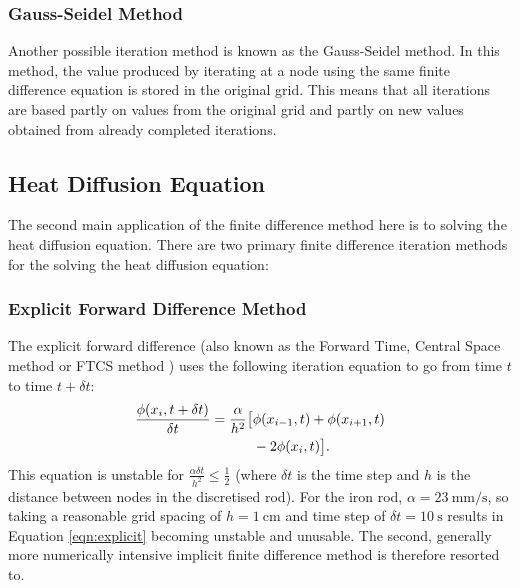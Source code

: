 \subsubsection{Gauss-Seidel Method}
\label{subsubsec:gauss-seidel}

Another possible iteration method is known as the Gauss-Seidel method. In this method, the value produced by iterating at a node using the same finite difference equation is stored in the original grid. This means that all iterations are based partly on values from the original grid and partly on new values obtained from already completed iterations.

\subsection{Heat Diffusion Equation}
\label{subsec:heat_diffusion_equation}

The second main application of the finite difference method here is to solving the heat diffusion equation. There are two primary finite difference iteration methods for the solving the heat diffusion equation:

\subsubsection{Explicit Forward Difference Method}
\label{subsubsec:explicit}

The explicit forward difference (also known as the Forward Time, Central Space method or FTCS method \cite{roache1972}) uses the following iteration equation to go from time $t$ to time $t+\delta t$:
\begin{align}
    \frac{\phi(x_i,t+\delta t)}{\delta t} = \frac{\alpha}{h^2}\big[&\phi(x_{i-1},t) + \phi(x_{i+1},t) \notag \\
                                                               & - 2\phi(x_i,t)\big].\label{eqn:explicit}
\end{align}
This equation is unstable for $\frac{\alpha \delta t}{h^2} \leq \frac{1}{2}$ \cite{tannehill1997} (where $\delta t$ is the time step and $h$ is the distance between nodes in the discretised rod). For the iron rod, $\alpha = \SI{23}{\milli\meter\per\second}$, so taking a reasonable grid spacing of $h = \SI{1}{\centi\metre}$ and time step of $\delta t = \SI{10}{\second}$ results in Equation \ref{eqn:explicit} becoming unstable and unusable. The second, generally more numerically intensive implicit finite difference method is therefore resorted to.

